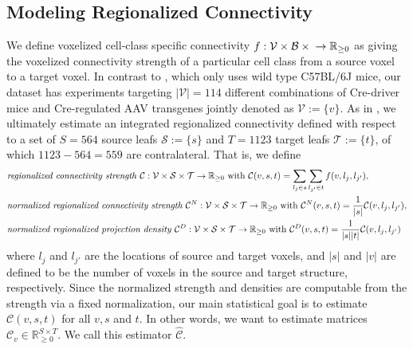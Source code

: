 \newpage

\subsection{Modeling Regionalized Connectivity}
\label{sec:modelling}

We define voxelized cell-class specific connectivity $f:  \mathcal V \times \mathcal B \times \mathbb \mathcal \to \mathbb R_{\geq 0}$ as giving the voxelized connectivity strength of a particular cell class from a source voxel to a target voxel.
In contrast to \citet{Knox2019-ot}, which only uses wild type C57BL/6J mice, our dataset has experiments targeting $|\mathcal V| = 114$ different combinations of Cre-driver mice and Cre-regulated AAV transgenes jointly denoted as $\mathcal V := \{v\}$.
As in \citet{Knox2019-ot}, we ultimately estimate an integrated regionalized connectivity defined with respect to a set of $S = 564$ source leafs $\mathcal S := \{ s\} $ and $T = 1123$ target leafs $\mathcal T := \{ t \}$, of which $1123 - 564  = 559$ are contralateral.
That is, we define
\begin{align*}
&\text{\textit {regionalized connectivity strength} } \mathcal C : \mathcal V \times \mathcal S \times \mathcal T \to \mathbb R_{\geq 0}  \text{ with } \mathcal C(v,s,t) = \sum_{l_{j} \in s} \sum_{l_{j'} \in  t} f(v,l_{j},l_{j'}), \\
&\text{\textit {normalized regionalized connectivity strength} } \mathcal C^N : \mathcal V \times \mathcal S \times \mathcal T \to \mathbb R_{\geq 0}  \text{ with } \mathcal C^N(v,s,t) = \frac{1}{|s|} \mathcal C(v,l_{j},l_{j'}), \\
&\text{\textit {normalized regionalized projection density} } \mathcal C^D : \mathcal V \times \mathcal S \times \mathcal T \to \mathbb R_{\geq 0} \text{ with } \mathcal C^D(v,s,t) = \frac{1}{| s | | t|}\mathcal C(v,l_{j},l_{j'})
\end{align*}
where $l_j$ and $l_{j'}$ are the locations of source and target voxels, and $|s|$ and $|v|$ are defined to be the number of voxels in the source and target structure, respectively.
Since the normalized strength and densities are computable from the strength via a fixed normalization, our main statistical goal is to estimate $\mathcal C (v,s,t) $ for all $v, s$ and $t$.%
In other words, we want to estimate matrices $\mathcal C_v \in \mathbb R_{\geq 0}^{S \times T}$.
We call this estimator $\widehat { \mathcal C } $.

